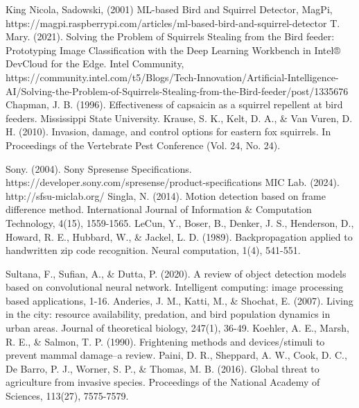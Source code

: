 \documentclass[conference]{IEEEtran}
\begin{document}
\begin{thebibliography}{00}

  King Nicola, Sadowski, (2001) ML-based Bird and Squirrel Detector, MagPi, https://magpi.raspberrypi.com/articles/ml-based-bird-and-squirrel-detector
  T. Mary. (2021). Solving the Problem of Squirrels Stealing from the Bird feeder: Prototyping Image Classification with the Deep Learning Workbench in Intel® DevCloud for the Edge. Intel Community, https://community.intel.com/t5/Blogs/Tech-Innovation/Artificial-Intelligence-AI/Solving-the-Problem-of-Squirrels-Stealing-from-the-Bird-feeder/post/1335676
 Chapman, J. B. (1996). Effectiveness of capsaicin as a squirrel repellent at bird feeders. Mississippi State University.
 Krause, S. K., Kelt, D. A., \& Van Vuren, D. H. (2010). Invasion, damage, and control options for eastern fox squirrels. In Proceedings of the Vertebrate Pest Conference (Vol. 24, No. 24). 

 Sony. (2004). Sony Spresense Specifications. https://developer.sony.com/spresense/product-specifications 
 MIC Lab. (2024). http://sfsu-miclab.org/ 
 Singla, N. (2014). Motion detection based on frame difference method. International Journal of Information \& Computation Technology, 4(15), 1559-1565. 
 LeCun, Y., Boser, B., Denker, J. S., Henderson, D., Howard, R. E., Hubbard, W., \& Jackel, L. D. (1989). Backpropagation applied to handwritten zip code recognition. Neural computation, 1(4), 541-551. 


  Sultana, F., Sufian, A., \& Dutta, P. (2020). A review of object detection models based on convolutional neural network. Intelligent computing: image processing based applications, 1-16.
 Anderies, J. M., Katti, M., \& Shochat, E. (2007). Living in the city: resource availability, predation, and bird population dynamics in urban areas. Journal of theoretical biology, 247(1), 36-49.
 Koehler, A. E., Marsh, R. E., \& Salmon, T. P. (1990). Frightening methods and devices/stimuli to prevent mammal damage--a review.
  Paini, D. R., Sheppard, A. W., Cook, D. C., De Barro, P. J., Worner, S. P., \& Thomas, M. B. (2016). Global threat to agriculture from invasive species. Proceedings of the National Academy of Sciences, 113(27), 7575-7579.
    

\end{thebibliography}
\end{document}
